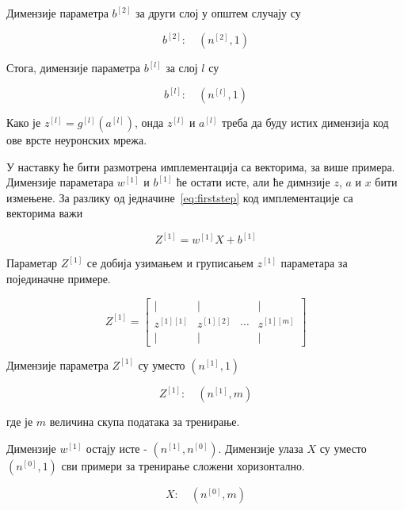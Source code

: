 \documentclass[master]{finthesis}
\begin{document}
Димензије параметра $b^{[2]}$ за други слој у општем случају су 

\begin{equation}
b^{[2]} : \quad (n^{[2]}, 1)
\end{equation}

Стога, димензије параметра $b^{[l]}$ за слој $l$ су 

\begin{equation}
b^{[l]} : \quad (n^{[l]}, 1)
\end{equation}

\vspace{2em}

Како је $z^{[l]}=g^{[l]}(a^{[l]})$, онда $z^{[l]}$ и $a^{[l]}$ треба да буду истих димензија код ове врсте неуронских мрежа.

У наставку ће бити размотрена имплементација са векторима, за више примера. Димензије параметара $w^{[1]}$ и $b^{[1]}$ ће остати исте, али ће димнзије $z$, $a$ и $x$ бити измењене. За разлику од једначине~\eqref{eq:firststep} код имплементације са векторима важи

\begin{equation}
Z^{[1]} = w^{[1]}X + b^{[1]}
\label{eq:firststepvector}
\end{equation}

Параметар $Z^{[1]}$ се добија узимањем и груписањем $z^{[1]}$ параметара за појединачне примере.

\[
Z^{[1]} =
\begin{bmatrix}
\vert & \vert &        & \vert \\
z^{[1][1]} & z^{[1][2]} & \cdots & z^{[1][m]} \\
\vert & \vert &        & \vert

\end{bmatrix}
\]

Димензије параметра $Z^{[1]}$ су уместо $(n^{[1]}, 1)$

\begin{equation}
Z^{[1]} : \quad (n^{[1]}, m)
\end{equation}

где је $m$ величина скупа података за тренирање. 



Димензије $w^{[1]}$ остају исте - $(n^{[1]}, n^{[0]})$. Димензије улаза $X$ су уместо $(n^{[0]}, 1)$ сви примери за тренирање сложени хоризонтално.

\begin{equation}
X : \quad (n^{[0]}, m)
\end{equation}
\end{document}
